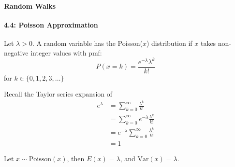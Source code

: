 \documentclass[letterpaper,12pt]{article}
\begin{document}
\paragraph{Random Walks}
\paragraph{4.4: Poisson Approximation}
Let $\lambda > 0$. A random variable has the Poisson($x$) distribution if $x$ takes non-negative 
integer values with pmf:
\[
    P(x = k) = \frac{e^{-\lambda}\lambda^k}{k!}
\] for $k \in \{0,1,2,3,\ldots\}$


Recall the Taylor series expansion of
\begin{align*}
    e^{\lambda} &= \sum^{\infty}_{k=0} \frac{\lambda^k}{k!}\\
                &= \sum^{\infty}_{k=0} e^{-\lambda} \frac{\lambda^k}{k!}\\
                &= e^{-\lambda} \sum^{\infty}_{k=0} \frac{\lambda^k}{k!}\\
                &= 1
\end{align*}


Let $x \sim \mathrm{Poisson}(x)$, then $E(x) = \lambda$, and $ \mathrm{Var}(x) = \lambda$.
\end{document}
